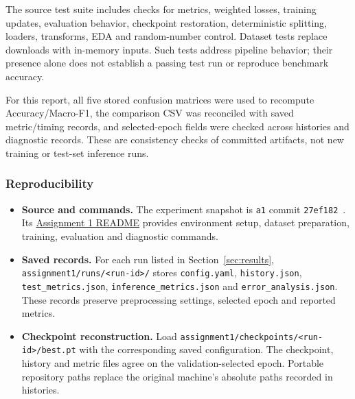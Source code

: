 The source test suite includes checks for metrics, weighted losses, training updates, evaluation behavior, checkpoint restoration, deterministic splitting, loaders, transforms, EDA and random-number control. Dataset tests replace downloads with in-memory inputs. Such tests address pipeline behavior; their presence alone does not establish a passing test run or reproduce benchmark accuracy.

For this report, all five stored confusion matrices were used to recompute Accuracy/Macro-F1, the comparison CSV was reconciled with saved metric/timing records, and selected-epoch fields were checked across histories and diagnostic records. These are consistency checks of committed artifacts, not new training or test-set inference runs.

\subsubsection{Reproducibility}
\begin{itemize}
\setlength{\itemsep}{3pt}\setlength{\parskip}{0pt}
\item \textbf{Source and commands.} The experiment snapshot is \texttt{a1} commit \texttt{27ef182}~\cite{code}. Its \href{https://github.com/Sunnyngooo/CO3133_Group05_Assignment/blob/27ef182308f0f6ac6f04510ee9fc77b9a16cc14a/assignment1/README.md}{Assignment 1 README} provides environment setup, dataset preparation, training, evaluation and diagnostic commands.
\item \textbf{Saved records.} For each run listed in Section~\ref{sec:results}, \texttt{assignment1/runs/<run-id>/} stores \texttt{config.yaml}, \texttt{history.json}, \texttt{test\_metrics.json}, \texttt{inference\_metrics.json} and \texttt{error\_analysis.json}. These records preserve preprocessing settings, selected epoch and reported metrics.
\item \textbf{Checkpoint reconstruction.} Load \texttt{assignment1/checkpoints/<run-id>/best.pt} with the corresponding saved configuration. The checkpoint, history and metric files agree on the validation-selected epoch. Portable repository paths replace the original machine's absolute paths recorded in histories.
\end{itemize}
